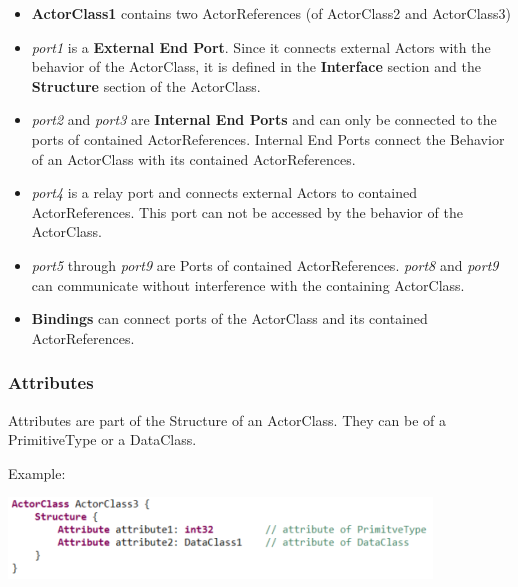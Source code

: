 
\begin{itemize}
\item \textbf{ActorClass1} contains two ActorReferences (of ActorClass2 and ActorClass3)
\item \textit{port1} is a \textbf{External End Port}. Since it connects external Actors with the behavior 
of the ActorClass, it is defined in the \textbf{Interface} section and the \textbf{Structure} section of 
the ActorClass.
\item \textit{port2} and \textit{port3} are \textbf{Internal End Ports} and can only be connected to the 
ports of contained ActorReferences. Internal End Ports connect the Behavior of an ActorClass with its 
contained ActorReferences.
\item \textit{port4} is a relay port and connects external Actors to contained ActorReferences. This port 
can not be accessed by the behavior of the ActorClass.
\item \textit{port5} through \textit{port9} are Ports of contained ActorReferences. \textit{port8} and 
\textit{port9} can communicate without interference with the containing ActorClass.
\item \textbf{Bindings} can connect ports of the ActorClass and its contained ActorReferences. 
\end{itemize}

\subsubsection{Attributes}

Attributes are part of the Structure of an ActorClass. They can be of a PrimitiveType or a DataClass.

Example:

\includegraphics{images/040-ActorClassAttributes.png}

